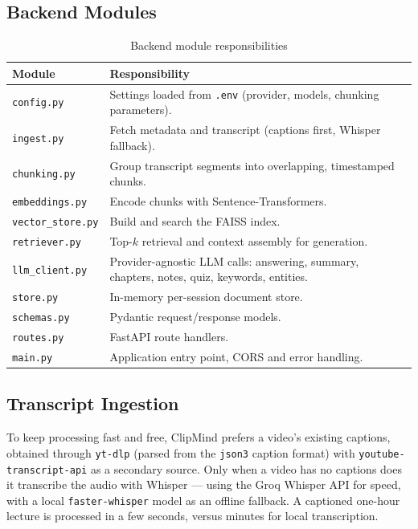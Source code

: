 \documentclass[11pt,a4paper]{article}
\newcommand{\code}[1]{\texttt{#1}}
\begin{document}
\subsection{Backend Modules}
\begin{table}[h]
\centering
\renewcommand{\arraystretch}{1.2}
\begin{tabularx}{\textwidth}{@{}l X@{}}
\toprule
\textbf{Module} & \textbf{Responsibility} \\
\midrule
\code{config.py}        & Settings loaded from \code{.env} (provider, models, chunking parameters). \\
\code{ingest.py}        & Fetch metadata and transcript (captions first, Whisper fallback). \\
\code{chunking.py}      & Group transcript segments into overlapping, timestamped chunks. \\
\code{embeddings.py}    & Encode chunks with Sentence-Transformers. \\
\code{vector\_store.py}  & Build and search the FAISS index. \\
\code{retriever.py}     & Top-$k$ retrieval and context assembly for generation. \\
\code{llm\_client.py}    & Provider-agnostic LLM calls: answering, summary, chapters, notes, quiz, keywords, entities. \\
\code{store.py}         & In-memory per-session document store. \\
\code{schemas.py}       & Pydantic request/response models. \\
\code{routes.py}        & FastAPI route handlers. \\
\code{main.py}          & Application entry point, CORS and error handling. \\
\bottomrule
\end{tabularx}
\caption{Backend module responsibilities}
\end{table}

\subsection{Transcript Ingestion}
To keep processing fast and free, ClipMind prefers a video's existing captions, obtained
through \code{yt-dlp} (parsed from the \code{json3} caption format) with
\code{youtube-transcript-api} as a secondary source. Only when a video has no captions
does it transcribe the audio with Whisper --- using the Groq Whisper API for speed, with
a local \code{faster-whisper} model as an offline fallback. A captioned one-hour lecture
is processed in a few seconds, versus minutes for local transcription.
\end{document}
